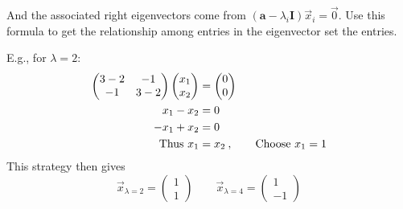\documentclass[12pts]{exam}
\newcommand{\ve}[1]{\ensuremath{\mathbf{#1}}}
\begin{document}
\begin{questions}
\begin{solution}
\begin{parts}
\newcommand{\lama}{2}
\newcommand{\lamb}{4}
 
And the associated right eigenvectors come from $(\ve{a} - \lambda_i \ve{I})\vec{x}_i = \vec{0}$. Use this formula to get the relationship among entries in the eigenvector set the entries. 

E.g., for $\lambda = \lama$:
%
\begin{align}
\begin{pmatrix}
   \aaa - \lama & \aab \\
   \aba & \abb - \lama \\
\end{pmatrix} 
\begin{pmatrix} x_1 \\ x_2 \end{pmatrix} &= 
\begin{pmatrix} 0 \\ 0 \end{pmatrix} \nonumber \\
%
 x_1 - x_2 &= 0  \nonumber \\
-x_1 + x_2 &= 0  \nonumber \\
%
\text{Thus } x_1 &= x_2\:, \qquad \text{Choose }x_1 = 1 \nonumber
\end{align}
This strategy then gives
\begin{equation}
\boxed{\vec{x}_{\lambda = \lama} = \begin{pmatrix} 1 \\ 1 \end{pmatrix} \qquad
\vec{x}_{\lambda = \lamb} = \begin{pmatrix} 1 \\ -1 \end{pmatrix}} \nonumber
\end{equation}


\end{parts}
\end{solution}
\end{questions}
\end{document}
